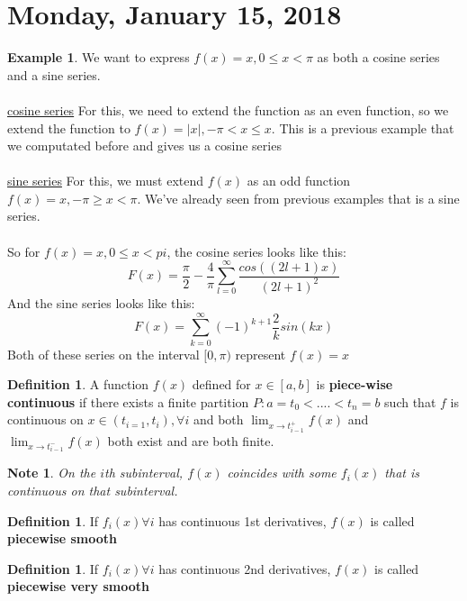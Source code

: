 \documentclass[12pt]{article}
\theoremstyle{plain}
\newtheorem*{note}{Note}
\theoremstyle{definition}
\newtheorem{definition}[theorem]{Definition}
\newtheorem{example}[theorem]{Example}
\begin{document}
\newpage

\section{Monday, January 15, 2018}

\begin{example}
	We want to express $f(x)=x, 0\leq x < \pi$ as both a cosine series and a sine series.\\
	\\
	\underline{cosine series}
	For this, we need to extend the function as an even function, so we extend the function to $f(x)=|x|, -\pi < x \leq x$. This is a previous example that we computated before and gives us a cosine series\\
	\\
	\underline{sine series}
	For this, we must extend $f(x)$ as an odd function $f(x)=x, -\pi \geq x < \pi$. We've already seen from previous examples that is a sine series.\\
	\\
	So for $f(x)=x, 0 \leq x < pi$, the cosine series looks like this:
	$$F(x) = \frac{\pi}{2} - \frac{4}{\pi} \sum^\infty_{l=0} \frac{cos((2l+1)x)}{(2l+1)^2}$$
	And the sine series looks like this:
	$$F(x) = \sum^\infty_{k=0} (-1)^{k+1} \frac{2}{k} sin(kx)$$
	Both of these series on the interval $[0,\pi)$ represent $f(x)=x$
\end{example}

\begin{definition}
	A function $f(x)$ defined for $x\in[a,b]$ is \textbf{piece-wise continuous} if there exists a finite partition $P: a=t_0< .... < t_n =b$ such that $f$ is continuous on $x\in(t_{i=1}, t_i), \forall i$ and both $\lim_{x\to t^+_{i-1}} f(x)$ and $\lim_{x\to t^-_{i-1}} f(x)$ both exist and are both finite.
\end{definition}

\begin{note}
	On the $i$th subinterval, $f(x)$ coincides with some $f_i (x)$ that is continuous on that subinterval.
\end{note}

\begin{definition}
	If $f_i (x) \forall i$ has continuous 1st derivatives, $f(x)$ is called \textbf{piecewise smooth}
\end{definition}

\begin{definition}
	If $f_i (x) \forall i$ has continuous 2nd derivatives, $f(x)$ is called \textbf{piecewise very smooth}
\end{definition}
\end{document}

